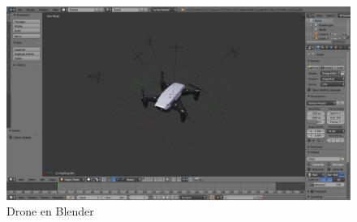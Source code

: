  \begin{figure}
    \centering
    \includegraphics[scale=0.3]{img/droneBlender.jpg}
    \caption{Drone en Blender} \label{fig:droneBlender}
\end{figure}

